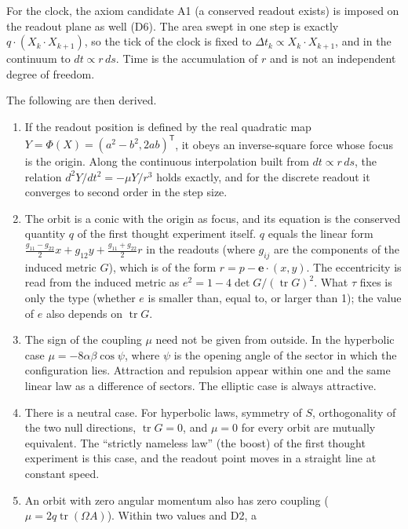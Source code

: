 \documentclass[
  a4paper,
]{article}
\providecommand{\tightlist}{%
  \setlength{\itemsep}{0pt}\setlength{\parskip}{0pt}}
\begin{document}
For the clock, the axiom candidate A1 (a conserved readout exists) is
imposed on the readout plane as well (D6). The area swept in one step is
exactly \(q\cdot(X_k\cdot X_{k+1})\), so the tick of the clock is fixed
to \(\Delta t_k\propto X_k\cdot X_{k+1}\), and in the continuum to
\(dt\propto r\,ds\). Time is the accumulation of \(r\) and is not an
independent degree of freedom.

The following are then derived.

\begin{enumerate}
\def\labelenumi{\arabic{enumi}.}
\tightlist
\item
  If the readout position is defined by the real quadratic map
  \(Y=\Phi(X)=(a^2-b^2,2ab)^{\mathsf T}\), it obeys an inverse-square
  force whose focus is the origin. Along the continuous interpolation
  built from \(dt\propto r\,ds\), the relation \(d^2Y/dt^2=-\mu Y/r^3\)
  holds exactly, and for the discrete readout it converges to second
  order in the step size.
\item
  The orbit is a conic with the origin as focus, and its equation is the
  conserved quantity \(q\) of the first thought experiment itself. \(q\)
  equals the linear form
  \(\frac{g_{11}-g_{22}}{2}x+g_{12}y+\frac{g_{11}+g_{22}}{2}r\) in the
  readouts (where \(g_{ij}\) are the components of the induced metric
  \(G\)), which is of the form \(r=p-\mathbf e\cdot(x,y)\). The
  eccentricity is read from the induced metric as
  \(e^2=1-4\det G/(\operatorname{tr}G)^2\). What \(\tau\) fixes is only
  the type (whether \(e\) is smaller than, equal to, or larger than 1);
  the value of \(e\) also depends on \(\operatorname{tr}G\).
\item
  The sign of the coupling \(\mu\) need not be given from outside. In
  the hyperbolic case \(\mu=-8\alpha\beta\cos\psi\), where \(\psi\) is
  the opening angle of the sector in which the configuration lies.
  Attraction and repulsion appear within one and the same linear law as
  a difference of sectors. The elliptic case is always attractive.
\item
  There is a neutral case. For hyperbolic laws, symmetry of \(S\),
  orthogonality of the two null directions, \(\operatorname{tr}G=0\),
  and \(\mu=0\) for every orbit are mutually equivalent. The ``strictly
  nameless law'' (the boost) of the first thought experiment is this
  case, and the readout point moves in a straight line at constant
  speed.
\item
  An orbit with zero angular momentum also has zero coupling
  (\(\mu=2q\operatorname{tr}(\Omega A)\)). Within two values and D2, a

\end{enumerate}
\end{document}
